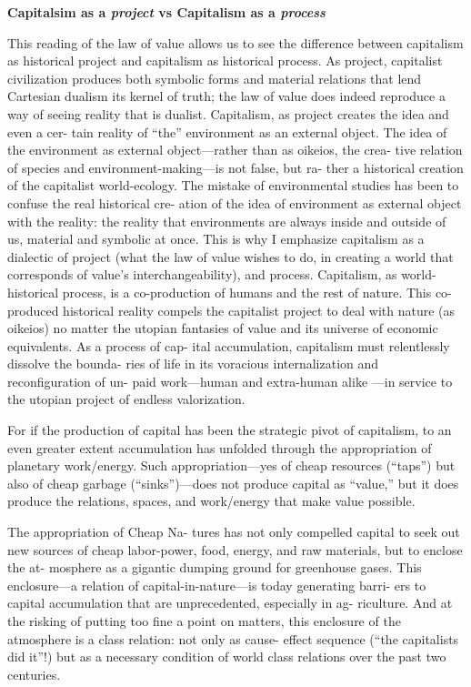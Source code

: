 \documentclass[
]{book}
\begin{document}
\textbf{Capitalsim as a \emph{project} vs Capitalism as a \emph{process} }

This reading of the law of value allows us to see the difference
between capitalism as historical project and capitalism as historical
process. As project, capitalist civilization produces both symbolic
forms and material relations that lend Cartesian dualism its kernel of
truth; the law of value does indeed reproduce a way of seeing reality
that is dualist. Capitalism, as project creates the idea and even a cer-
tain reality of ``the'' environment as an external object. The idea of
the environment as external object---rather than as oikeios, the crea-
tive relation of species and environment-making---is not false, but ra-
ther a historical creation of the capitalist world-ecology. The mistake
of environmental studies has been to confuse the real historical cre-
ation of the idea of environment as external object with the reality: the
reality that environments are always inside and outside of us, material
and symbolic at once. This is why I emphasize capitalism as a dialectic
of project (what the law of value wishes to do, in creating a world that
corresponds of value's interchangeability), and process. Capitalism,
as world-historical process, is a co-production of humans and the rest
of nature. This co-produced historical reality compels the capitalist
project to deal with nature (as oikeios) no matter the utopian fantasies
of value and its universe of economic equivalents. As a process of cap-
ital accumulation, capitalism must relentlessly dissolve the bounda-
ries of life in its voracious internalization and reconfiguration of un-
paid work---human and extra-human alike ---in service to the utopian project of endless
valorization.

For if the production of capital
has been the strategic pivot of capitalism, to an even greater extent
accumulation has unfolded through the appropriation of planetary
work/energy. Such appropriation---yes of cheap resources (``taps'')
but also of cheap garbage (``sinks'')---does not produce capital as
``value,'' but it does produce the relations, spaces, and work/energy
that make value possible.

The appropriation of Cheap Na-
tures has not only compelled capital to seek out new sources of cheap
labor-power, food, energy, and raw materials, but to enclose the at-
mosphere as a gigantic dumping ground for greenhouse gases. This
enclosure---a relation of capital-in-nature---is today generating barri-
ers to capital accumulation that are unprecedented, especially in ag-
riculture. And at the risking of putting too fine a point on matters,
this enclosure of the atmosphere is a class relation: not only as cause-
effect sequence (``the capitalists did it''!) but as a necessary condition
of world class relations over the past two centuries.
\end{document}
